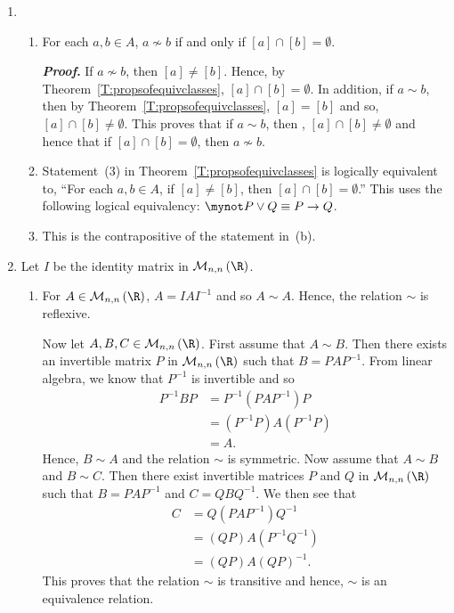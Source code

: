 \begin{enumerate}
\item \begin{enumerate}
\item For each  $a, b \in A$,    $a\nsim b$ if and only if   
        $\left[ a \right] \cap \left[ b \right] = \emptyset $.

\textbf{\emph{Proof}.}  If $a\nsim b$, then $\left[ a \right] \ne \left[ b \right]$.  Hence, by Theorem~\ref{T:propsofequivclasses}, $\left[ a \right] \cap \left[ b \right] = \emptyset $.  In addition, if $a \sim b$, then by Theorem~\ref{T:propsofequivclasses}, 
$\left[ a \right] = \left[ b \right]$ and so, 
$\left[ a \right] \cap \left[ b \right] \ne \emptyset $.  This proves that if $a \sim b$, then , $\left[ a \right] \cap \left[ b \right] \ne \emptyset $ and hence that if 
$\left[ a \right] \cap \left[ b \right] = \emptyset $, then $a \nsim b$.

\item Statement~(3) in Theorem~\ref{T:propsofequivclasses} is logically equivalent to, 
``For each  $a, b \in A$,   if  $\left[ a \right] \ne \left[ b \right]$, then   
$\left[ a \right] \cap \left[ b \right] = \emptyset $.''  This uses the following logical equivalency:  $\mynot P \vee Q \equiv P \to Q$.

\item This is the contrapositive of the statement in~(b).
\end{enumerate}



\item Let $I$ be the identity matrix in $\mathcal{M}_{n, n}\left( \R \right)$.
\begin{enumerate}
\item For $A \in \mathcal{M}_{n, n}\left( \R \right)$, $A = IAI^{-1}$ and so $A \sim A$.  Hence, the relation $\sim$ is reflexive.  

Now let $A, B, C \in \mathcal{M}_{n, n}\left( \R \right)$.  First assume that $A \sim B$.  Then there exists an invertible matrix $P$ in $\mathcal{M}_{n, n}\left( \R \right)$ such that $B = PAP^{-1}$.  From linear algebra, we know that $P^{-1}$ is invertible and so
\begin{align*}
P^{-1}BP &= P^{-1} \left( PAP^{-1} \right) P \\
         &= \left( P^{-1}P \right) A \left( P^{-1} P \right) \\
         &= A.
\end{align*}
Hence, $B \sim A$ and the relation $\sim$ is symmetric.  Now assume that $A \sim B$ and 
$B \sim C$.  Then there exist invertible matrices $P$ and $Q$ in 
$\mathcal{M}_{n, n}\left( \R \right)$ such that $B = PAP^{-1}$ and $C = QBQ^{-1}$.  We then see that
\begin{align*}
C &= Q \left( PAP^{-1} \right) Q^{-1} \\
  &= \left(QP \right) A \left( P^{-1} Q^{-1} \right) \\
  &= \left( QP \right) A \left( QP \right)^{-1}.
\end{align*}
This proves that the relation $\sim$ is transitive and hence, $\sim$ is an equivalence relation.


\end{enumerate}
\end{enumerate}

